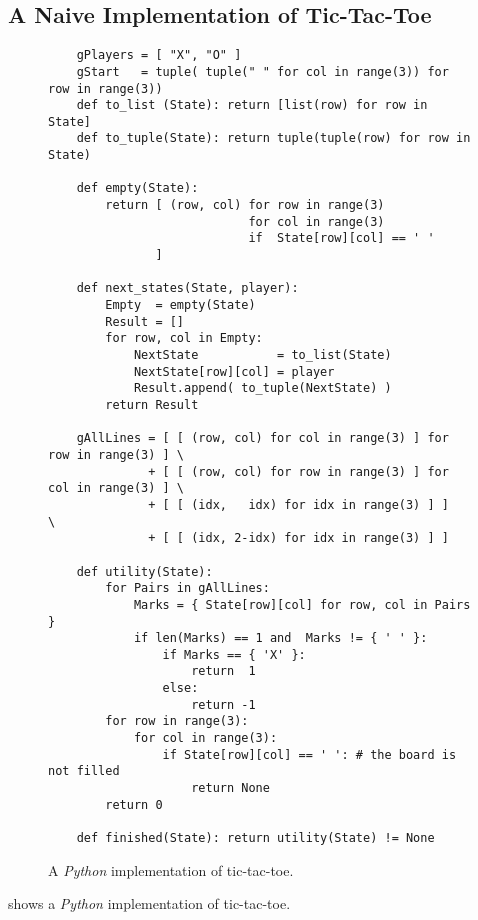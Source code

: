\subsection{A Naive Implementation of Tic-Tac-Toe}
\begin{figure}[!ht]
\centering
\begin{verbatim}
    gPlayers = [ "X", "O" ]
    gStart   = tuple( tuple(" " for col in range(3)) for row in range(3))
    def to_list (State): return [list(row) for row in State]
    def to_tuple(State): return tuple(tuple(row) for row in State)
    
    def empty(State):
        return [ (row, col) for row in range(3)
                            for col in range(3)
                            if  State[row][col] == ' ' 
               ]
    
    def next_states(State, player):
        Empty  = empty(State)
        Result = []
        for row, col in Empty:
            NextState           = to_list(State)
            NextState[row][col] = player
            Result.append( to_tuple(NextState) )
        return Result
    
    gAllLines = [ [ (row, col) for col in range(3) ] for row in range(3) ] \
              + [ [ (row, col) for row in range(3) ] for col in range(3) ] \
              + [ [ (idx,   idx) for idx in range(3) ] ]                   \
              + [ [ (idx, 2-idx) for idx in range(3) ] ]
    
    def utility(State):
        for Pairs in gAllLines:
            Marks = { State[row][col] for row, col in Pairs }
            if len(Marks) == 1 and  Marks != { ' ' }: 
                if Marks == { 'X' }:
                    return  1
                else:
                    return -1
        for row in range(3):
            for col in range(3):
                if State[row][col] == ' ': # the board is not filled
                    return None   
        return 0            
    
    def finished(State): return utility(State) != None
\end{verbatim}
\caption{A \textsl{Python} implementation of tic-tac-toe.}
\label{fig:Tic-Tac-Toe.ipynb}
\end{figure}
\myFig{Tic-Tac-Toe.ipynb} shows a \textsl{Python} implementation of tic-tac-toe.
\index{tic-tac-toe}
\FloatBarrier

